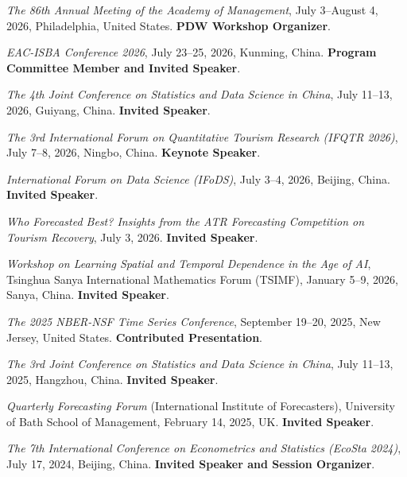 \documentclass[twoside,a4paper]{article}
\begin{document}
\begin{etaremune}[itemsep=0ex,parsep=0pt]

\item \textit{The 86th Annual Meeting of the Academy of Management}, July 3--August 4, 2026, Philadelphia, United States. \textbf{PDW Workshop Organizer}.

\item \textit{EAC-ISBA Conference 2026}, July 23--25, 2026, Kunming, China. \textbf{Program Committee Member and Invited Speaker}.

\item \textit{The 4th Joint Conference on Statistics and Data Science in China}, July 11--13, 2026, Guiyang, China. \textbf{Invited Speaker}.

\item \textit{The 3rd International Forum on Quantitative Tourism Research (IFQTR 2026)}, July 7--8, 2026, Ningbo, China. \textbf{Keynote Speaker}.

\item \textit{International Forum on Data Science (IFoDS)}, July 3--4, 2026, Beijing, China. \textbf{Invited Speaker}.

\item \textit{Who Forecasted Best? Insights from the ATR Forecasting Competition on Tourism Recovery}, July 3, 2026. \textbf{Invited Speaker}.

\item \textit{Workshop on Learning Spatial and Temporal Dependence in the Age of AI}, Tsinghua Sanya International Mathematics Forum (TSIMF), January 5--9, 2026, Sanya, China. \textbf{Invited Speaker}.

\item \textit{The 2025 NBER-NSF Time Series Conference}, September 19--20, 2025, New Jersey, United States. \textbf{Contributed Presentation}.

\item \textit{The 3rd Joint Conference on Statistics and Data Science in China}, July 11--13, 2025, Hangzhou, China. \textbf{Invited Speaker}.

\item \textit{Quarterly Forecasting Forum} (International Institute of Forecasters), University of Bath School of Management, February 14, 2025, UK. \textbf{Invited Speaker}.

\item \textit{The 7th International Conference on Econometrics and Statistics (EcoSta 2024)}, July 17, 2024, Beijing, China. \textbf{Invited Speaker and Session Organizer}.


\end{etaremune}
\end{document}
